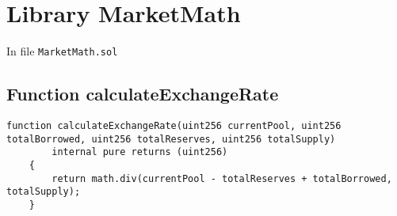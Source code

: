 
\section{Library MarketMath}

In file {\tt MarketMath.sol}

\subsection{Function calculateExchangeRate}

\begin{lstlisting}[firstnumber=14]
    function calculateExchangeRate(uint256 currentPool, uint256 totalBorrowed, uint256 totalReserves, uint256 totalSupply)
        internal pure returns (uint256) 
    {
        return math.div(currentPool - totalReserves + totalBorrowed, totalSupply);
    }
\end{lstlisting}


